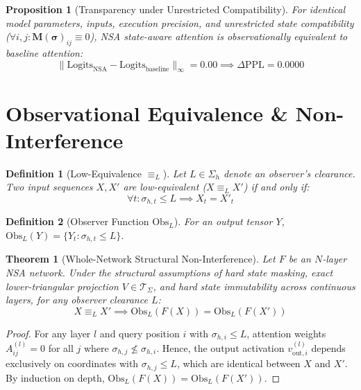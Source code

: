 \documentclass[10pt,twocolumn,letterpaper]{article}
\newtheorem{theorem}{Theorem}
\newtheorem{definition}{Definition}
\newtheorem{proposition}{Proposition}
\begin{document}
\begin{proposition}[Transparency under Unrestricted Compatibility]
For identical model parameters, inputs, execution precision, and unrestricted state compatibility ($\forall i, j: \mathbf{M}(\boldsymbol{\sigma})_{ij} \equiv 0$), NSA state-aware attention is observationally equivalent to baseline attention:
\begin{equation}
\|\text{Logits}_{\text{NSA}} - \text{Logits}_{\text{baseline}}\|_\infty = 0.00 \implies \Delta \text{PPL} = 0.0000
\end{equation}
\end{proposition}

\section{Observational Equivalence \& Non-Interference}

\begin{definition}[Low-Equivalence $\equiv_L$]
Let $L \in \Sigma_h$ denote an observer's clearance. Two input sequences $X, X'$ are low-equivalent ($X \equiv_L X'$) if and only if:
\begin{equation}
\forall t : \sigma_{h,t} \le L \implies X_t = X'_t
\end{equation}
\end{definition}

\begin{definition}[Observer Function $\text{Obs}_L$]
For an output tensor $Y$, $\text{Obs}_L(Y) = \{ Y_t : \sigma_{h,t} \le L \}$.
\end{definition}

\begin{theorem}[Whole-Network Structural Non-Interference]
Let $F$ be an $N$-layer NSA network. Under the structural assumptions of hard state masking, exact lower-triangular projection $V \in \mathcal{T}_\Sigma$, and hard state immutability across continuous layers, for any observer clearance $L$:
\begin{equation}
X \equiv_L X' \implies \text{Obs}_L(F(X)) = \text{Obs}_L(F(X'))
\end{equation}
\end{theorem}

\begin{proof}
For any layer $l$ and query position $i$ with $\sigma_{h,i} \le L$, attention weights $A_{ij}^{(l)} = 0$ for all $j$ where $\sigma_{h,j} \not\le \sigma_{h,i}$. Hence, the output activation $v_{\text{out}, i}^{(l)}$ depends exclusively on coordinates with $\sigma_{h,j} \le L$, which are identical between $X$ and $X'$. By induction on depth, $\text{Obs}_L(F(X)) = \text{Obs}_L(F(X'))$.
\end{proof}
\end{document}
